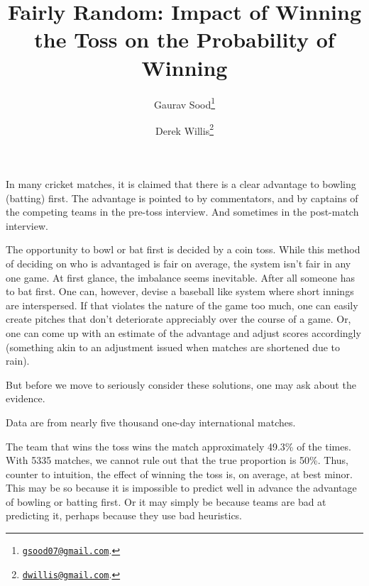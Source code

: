 \documentclass[11pt]{article}
\begin{document}
\title{\vspace{-2.0cm}\normalsize{\textbf{Fairly Random: Impact of Winning the Toss on the Probability of Winning}}}
\author{Gaurav Sood\thanks{\href{mailto:gsood07@gmail.com}{\texttt{gsood07@gmail.com}}.} \and Derek Willis\thanks{\href{mailto:dwillis@gmail.com}{\texttt{dwillis@gmail.com}}.}}
\maketitle
\doublespacing



In many cricket matches, it is claimed that there is a clear advantage to bowling (batting) first. The advantage is pointed to by commentators, and by captains of the competing teams in the pre-toss interview. And sometimes in the post-match interview.

The opportunity to bowl or bat first is decided by a coin toss. While this method of deciding on who is advantaged is fair on average, the system isn't fair in any one game. At first glance, the imbalance seems inevitable. After all someone has to bat first. One can, however, devise a baseball like system where short innings are interspersed. If that violates the nature of the game too much, one can easily create pitches that don't deteriorate appreciably over the course of a game. Or, one can come up with an estimate of the advantage and adjust scores accordingly (something akin to an adjustment issued when matches are shortened due to rain).

But before we move to seriously consider these solutions, one may ask about the evidence.

Data are from nearly five thousand one-day international matches.

The team that wins the toss wins the match approximately 49.3\% of the times. With 5335 matches, we cannot rule out that the true proportion is 50\%. Thus, counter to intuition, the effect of winning the toss is, on average, at best minor. This may be so because it is impossible to predict well in advance the advantage of bowling or batting first. Or it may simply be because teams are bad at predicting it, perhaps because they use bad heuristics.
\end{document}
